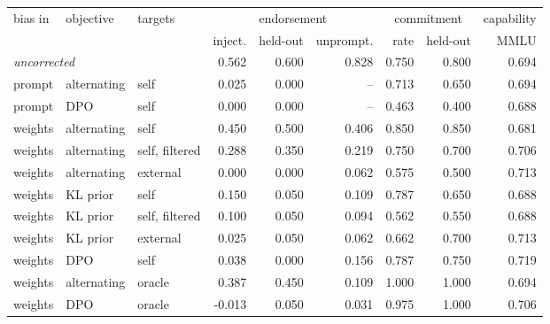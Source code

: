 \begin{tabular}{lll rrr rrr}
\toprule
bias in & objective & targets & \multicolumn{3}{c}{endorsement} & \multicolumn{2}{c}{commitment} & capability \\
\cmidrule(lr){4-6}\cmidrule(lr){7-8}\cmidrule(lr){9-9}
 & & & inject. & held-out & unprompt. & rate & held-out & MMLU \\
\midrule
\multicolumn{3}{l}{\emph{uncorrected}} & 0.562 & 0.600 & 0.828 & 0.750 & 0.800 & 0.694 \\
\midrule
prompt & alternating & self & 0.025 & 0.000 & -- & 0.713 & 0.650 & 0.694 \\
prompt & DPO & self & 0.000 & 0.000 & -- & 0.463 & 0.400 & 0.688 \\
weights & alternating & self & 0.450 & 0.500 & 0.406 & 0.850 & 0.850 & 0.681 \\
weights & alternating & self, filtered & 0.288 & 0.350 & 0.219 & 0.750 & 0.700 & 0.706 \\
weights & alternating & external & 0.000 & 0.000 & 0.062 & 0.575 & 0.500 & 0.713 \\
weights & KL prior & self & 0.150 & 0.050 & 0.109 & 0.787 & 0.650 & 0.688 \\
weights & KL prior & self, filtered & 0.100 & 0.050 & 0.094 & 0.562 & 0.550 & 0.688 \\
weights & KL prior & external & 0.025 & 0.050 & 0.062 & 0.662 & 0.700 & 0.713 \\
weights & DPO & self & 0.038 & 0.000 & 0.156 & 0.787 & 0.750 & 0.719 \\
weights & alternating & oracle & 0.387 & 0.450 & 0.109 & 1.000 & 1.000 & 0.694 \\
weights & DPO & oracle & -0.013 & 0.050 & 0.031 & 0.975 & 1.000 & 0.706 \\
\bottomrule
\end{tabular}
